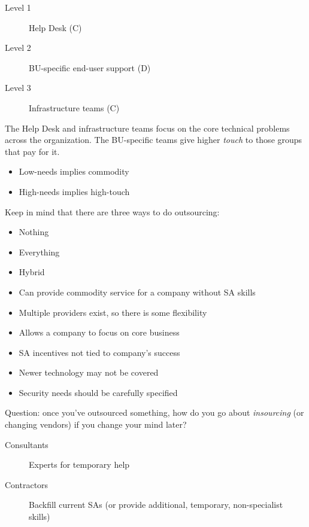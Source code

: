 \documentclass{slides}
\newcommand{\bi}{\begin{itemize}}
\newcommand{\ei}{\end{itemize}}
\newcommand{\bd}{\begin{description}}
\newcommand{\ed}{\end{description}}
\begin{document}

\bd
\item[Level 1] Help Desk (C)
\item[Level 2] BU-specific end-user support (D)
\item[Level 3] Infrastructure teams (C)
\ed

The Help Desk and infrastructure teams focus on the core technical 
problems across the organization.  The BU-specific teams give 
higher \emph{touch} to those groups that pay for it.


\bi
\item Low-needs implies commodity
\item High-needs implies high-touch
\ei

Keep in mind that there are three ways to do outsourcing:

\bi
\item Nothing
\item Everything
\item Hybrid
\ei


\bi
\item Can provide commodity service for a company without SA skills
\item Multiple providers exist, so there is some flexibility
\item Allows a company to focus on core business
\ei


\bi
\item SA incentives not tied to company's success
\item Newer technology may not be covered
\item Security needs should be carefully specified
\ei


Question: once you've outsourced something, how do you go about
\emph{insourcing} (or changing vendors) if you change your mind later?


\bd
\item[Consultants] Experts for temporary help
\item[Contractors] Backfill current SAs (or provide additional,
  temporary, non-specialist skills)
\ed

\end{document}
